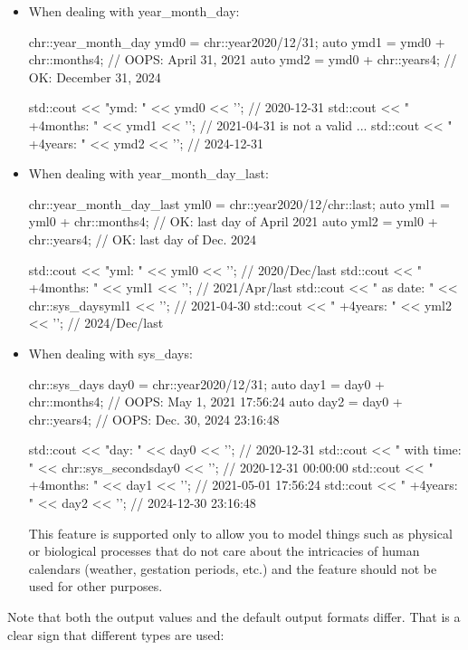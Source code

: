 \begin{itemize}
\item 
When dealing with year\_month\_day:

\begin{cpp}
chr::year_month_day ymd0 = chr::year{2020}/12/31;
auto ymd1 = ymd0 + chr::months{4}; // OOPS: April 31, 2021
auto ymd2 = ymd0 + chr::years{4}; // OK: December 31, 2024

std::cout << "ymd: " << ymd0 << '\n'; // 2020-12-31
std::cout << " +4months: " << ymd1 << '\n'; // 2021-04-31 is not a valid ...
std::cout << " +4years: " << ymd2 << '\n'; // 2024-12-31
\end{cpp}

\item 
When dealing with year\_month\_day\_last:

\begin{cpp}
chr::year_month_day_last yml0 = chr::year{2020}/12/chr::last;
auto yml1 = yml0 + chr::months{4}; // OK: last day of April 2021
auto yml2 = yml0 + chr::years{4}; // OK: last day of Dec. 2024

std::cout << "yml: " << yml0 << '\n'; // 2020/Dec/last
std::cout << " +4months: " << yml1 << '\n'; // 2021/Apr/last
std::cout << " as date: "
		  << chr::sys_days{yml1} << '\n'; // 2021-04-30
std::cout << " +4years: " << yml2 << '\n'; // 2024/Dec/last
\end{cpp}

\item 
When dealing with sys\_days:

\begin{cpp}
chr::sys_days day0 = chr::year{2020}/12/31;
auto day1 = day0 + chr::months{4}; // OOPS: May 1, 2021 17:56:24
auto day2 = day0 + chr::years{4}; // OOPS: Dec. 30, 2024 23:16:48

std::cout << "day: " << day0 << '\n'; // 2020-12-31
std::cout << " with time: "
		  << chr::sys_seconds{day0} << '\n'; // 2020-12-31 00:00:00
std::cout << " +4months: " << day1 << '\n'; // 2021-05-01 17:56:24
std::cout << " +4years: " << day2 << '\n'; // 2024-12-30 23:16:48
\end{cpp}

This feature is supported only to allow you to model things such as physical or biological processes that do not care about the intricacies of human calendars (weather, gestation periods, etc.) and the feature should not be used for other purposes.
\end{itemize}

Note that both the output values and the default output formats differ. That is a clear sign that different types are used:

